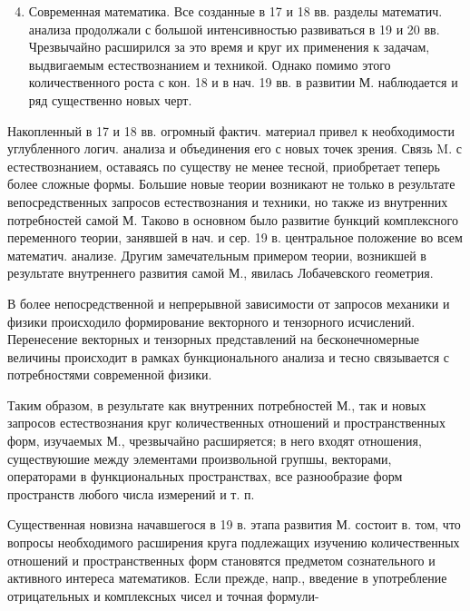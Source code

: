 \documentclass[10pt]{article}
\begin{document}
\begin{enumerate}

  \setcounter{enumi}{3}

  \item Современная математика. Все созданные в 17 и 18 вв. разделы математич. анализа продолжали с большой интенсивностью развиваться в 19 и 20 вв. Чрезвычайно расширился за это время и круг их применения к задачам, выдвигаемым естествознанием и техникой. Однако помимо этого количественного роста с кон. 18 и в нач. 19 вв. в развитии М. наблюдается и ряд существенно новых черт.

\end{enumerate}



Накопленный в 17 и 18 вв. огромный фактич. материал привел к необходимости углубленного логич. анализа и объединения его с новых точек зрения. Связь M. с естествознанием, оставаясь по существу не менее тесной, приобретает теперь более сложные формы. Большие новые теории возникают не только в результате вепосредственных запросов естествознания и техники, но также из внутренних потребностей самой М. Таково в основном было развитие бункций комплексного переменного теории, занявшей в нач. и сер. 19 в. центральное положение во всем математич. анализе. Другим замечательным примером теории, возникшей в результате внутреннего развития самой М., явилась Лобачевского геометрия.



В более непосредственной и непрерывной зависимости от запросов механики и физики происходило формирование векторного и тензорного исчислений. Перенесение векторных и тензорных представлений на бесконечномерные величины происходит в рамках бункционального анализа и тесно связывается с потребностями современной физики.



Таким образом, в результате как внутренних потребностей М., так и новых запросов естествознания круг количественных отношений и пространственных форм, изучаемых М., чрезвычайно расширяется; в него входят отношения, существуюшие между элементами произвольной групшы, векторами, операторами в функциональных пространствах, все разнообразие форм пространств любого числа измерений и т. п.



Существенная новизна начавшегося в 19 в. этапа развития М. состоит в. том, что вопросы необходимого расширения круга подлежащих изучению количественных отношений и пространственных форм становятся предметом сознательного и активного интереса математиков. Если прежде, напр., введение в употребление отрицательных и комплексных чисел и точная формули-
\end{document}

